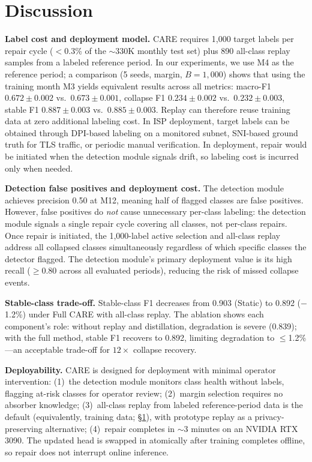 \documentclass[journal]{IEEEtran}
\newcommand{\ours}{CARE}  %
\begin{document}
\section{Discussion}
\label{sec:discussion}

\textbf{Label cost and deployment model.}
\ours{} requires 1{,}000 target labels per repair cycle ($<$0.3\% of the ${\sim}$330K monthly test set) plus 890 all-class replay samples from a labeled reference period.
In our experiments, we use M4 as the reference period; a comparison (5 seeds, margin, $B{=}1{,}000$) shows that using the training month M3 yields equivalent results across all metrics: macro-F1 $0.672{\pm}0.002$ vs.\ $0.673{\pm}0.001$, collapse F1 $0.234{\pm}0.002$ vs.\ $0.232{\pm}0.003$, stable F1 $0.887{\pm}0.003$ vs.\ $0.885{\pm}0.003$.
Replay can therefore reuse training data at zero additional labeling cost.
In ISP deployment, target labels can be obtained through DPI-based labeling on a monitored subnet, SNI-based ground truth for TLS traffic, or periodic manual verification.
In deployment, repair would be initiated when the detection module signals drift, so labeling cost is incurred only when needed.

\textbf{Detection false positives and deployment cost.}
The detection module achieves precision 0.50 at M12, meaning half of flagged classes are false positives.
However, false positives do \textit{not} cause unnecessary per-class labeling: the detection module signals a single repair cycle covering all classes, not per-class repairs.
Once repair is initiated, the 1{,}000-label active selection and all-class replay address all collapsed classes simultaneously regardless of which specific classes the detector flagged.
The detection module's primary deployment value is its high recall ($\geq$0.80 across all evaluated periods), reducing the risk of missed collapse events.

\textbf{Stable-class trade-off.}
Stable-class F1 decreases from 0.903 (Static) to 0.892 ($-$1.2\%) under Full \ours{} with all-class replay.
The ablation shows each component's role: without replay and distillation, degradation is severe (0.839); with the full method, stable F1 recovers to 0.892, limiting degradation to ${\leq}$1.2\%---an acceptable trade-off for $12{\times}$ collapse recovery.

\textbf{Deployability.}
\ours{} is designed for deployment with minimal operator intervention:
(1)~the detection module monitors class health without labels, flagging at-risk classes for operator review;
(2)~margin selection requires no absorber knowledge;
(3)~all-class replay from labeled reference-period data is the default (equivalently, training data; \S\ref{sec:discussion}), with prototype replay as a privacy-preserving alternative;
(4)~repair completes in ${\sim}$3 minutes on an NVIDIA RTX 3090.
The updated head is swapped in atomically after training completes offline, so repair does not interrupt online inference.
\end{document}
